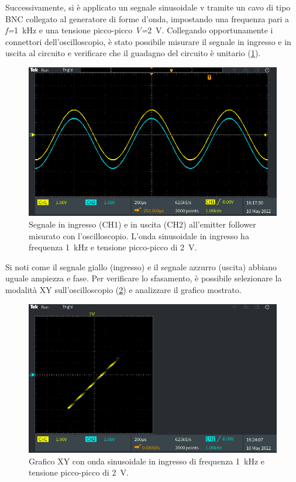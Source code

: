 Successivamente, si è applicato un segnale sinusoidale v tramite un cavo di tipo BNC collegato al generatore di forme d'onda, impostando una frequenza pari a \textit{f=}\SI{1}{\kilo\hertz} e una tensione picco-picco \textit{V=}\SI{2}{\volt}. Collegando opportunamente i connettori dell'oscilloscopio, è stato possibile misurare il segnale in ingresso e in uscita al circuito e verificare che il guadagno del circuito è unitario (\Fig\ref{fig:emitterfollwer_oscilloscopio_1}).
\begin{figure}[h!]
	\centering
	\includegraphics[width=0.7\linewidth]{./ImageFiles/Laboratorio 1/TEK00005}
	\caption{Segnale in ingresso (CH1) e in uscita (CH2) all'emitter follower misurato con l'oscilloscopio. L'onda sinusoidale in ingresso ha frequenza \SI{1}{\kilo\hertz} e tensione picco-picco di \SI{2}{\volt}.}
	\label{fig:emitterfollwer_oscilloscopio_1}
\end{figure}
Si noti come il segnale giallo (ingresso) e il segnale azzurro (uscita) abbiano uguale ampiezza e fase. Per verificare lo sfasamento, è possibile selezionare la modalità XY sull'oscilloscopio (\Fig\ref{fig:emitterfollwer_XY_1}) e analizzare il grafico mostrato.
\begin{figure}[h!]
	\centering
	\includegraphics[width=0.7\linewidth]{./ImageFiles/Laboratorio 1/TEK00008}
	\caption{Grafico XY con onda sinusoidale in ingresso di frequenza \SI{1}{\kilo\hertz} e tensione picco-picco di \SI{2}{\volt}.}
	\label{fig:emitterfollwer_XY_1}
\end{figure}
